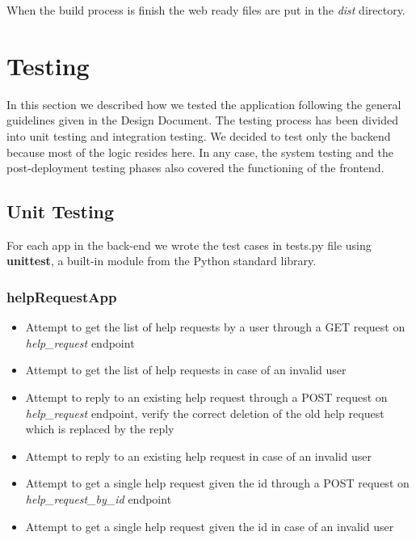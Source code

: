 \documentclass[table, 12pt]{article}
\begin{document}
When the build process is finish the web ready files are put in the \textit{dist} directory.

\newpage
\section{Testing}

In this section we described how we tested the application following the general guidelines given in the Design Document.
The testing process has been divided into unit testing and integration testing.
We decided to test only the backend because most of the logic resides here.
In any case, the system testing and the post-deployment testing phases also covered the functioning of the frontend.

\subsection{Unit Testing}
For each app in the back-end we wrote the test cases in tests.py file using \textbf{unittest}, a built-in module from the Python standard library.
\subsubsection*{helpRequestApp}
\begin{itemize}
    \item Attempt to get the list of help requests by a user through a GET request on \textit{help\_request} endpoint
    \item Attempt to get the list of help requests in case of an invalid user
    \item Attempt to reply to an existing help request through a POST request on \textit{help\_request} endpoint, verify the correct deletion of the old help request which is replaced by the reply
    \item Attempt to reply to an existing help request in case of an invalid user
    \item Attempt to get a single help request given the id through a POST request on \textit{help\_request\_by\_id} endpoint
    \item Attempt to get a single help request given the id in case of an invalid user
\end{itemize}
\end{document}
